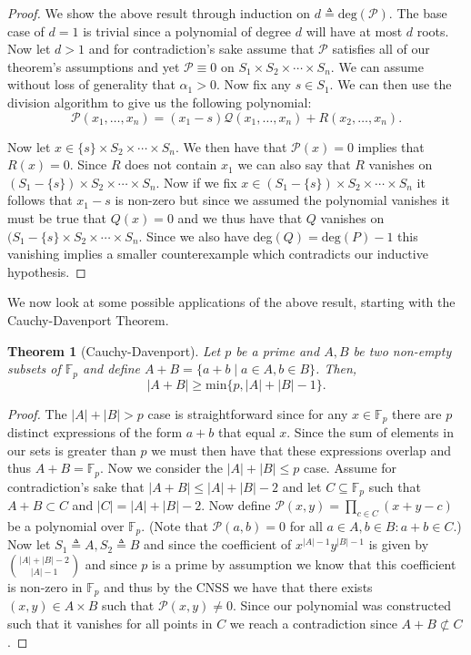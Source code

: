 \documentclass[11pt]{article}
\newtheorem{theorem}{Theorem}
\theoremstyle{definition}
\numberwithin{equation}{subsection}
\begin{document}
\begin{proof}
We show the above result through induction on $d\triangleq \text{deg}(\mathcal{P})$. The base case of $d=1$ is trivial since a polynomial of degree $d$ will have at most $d$ roots. Now let $d>1$ and for contradiction's sake assume that $\mathcal{P}$ satisfies all of our theorem's assumptions and yet $\mathcal{P}\equiv 0$ on $S_1\times S_2\times\cdots\times S_n$. We can assume without loss of generality that $\alpha_1>0$. Now fix any $s\in S_1$. We can then use the division algorithm to give us the following polynomial: $$\mathcal{P}(x_1,\ldots,x_n)=(x_1-s)\mathcal{Q}(x_1,\ldots,x_n)+R(x_2,\ldots,x_n).$$ 

Now let $x\in \{s\}\times S_2\times\cdots\times S_n$. We then have that $\mathcal{P}(x)=0$ implies that $R(x)=0$. Since $R$ does not contain $x_1$ we can also say that $R$ vanishes on $(S_1-\{s\})\times S_2\times\cdots\times S_n$. Now if we fix $x\in (S_1-\{s\})\times S_2\times\cdots\times S_n$ it follows that $x_1-s$ is non-zero but since we assumed the polynomial vanishes it must be true that $Q(x)=0$ and we thus have that $Q$ vanishes on $(S_1-\{s\}\times S_2\times\cdots\times S_n$. Since we also have deg$(Q)=\text{deg}(P)-1$ this vanishing implies a smaller counterexample which contradicts our inductive hypothesis.
\end{proof}

We now look at some possible applications of the above result, starting with the Cauchy-Davenport Theorem.

\begin{theorem}[Cauchy-Davenport]
Let $p$ be a prime and $A,B$ be two non-empty subsets of $\mathbb{F}_p$ and define $A+B=\{a+b\mid a\in A, b\in B\}$. Then, $$|A+B|\geq \text{min}\{p, |A|+|B|-1\}.$$
\end{theorem}

\begin{proof}
The $|A|+|B|>p$ case is straightforward since for any $x\in \mathbb{F}_p$ there are $p$ distinct expressions of the form $a+b$ that equal $x$. Since the sum of elements in our sets is greater than $p$ we must then have that these expressions overlap and thus $A+B=\mathbb{F}_p$. Now we consider the $|A|+|B|\leq p$ case. Assume for contradiction's sake that $|A+B|\leq |A|+|B|-2$ and let $C\subseteq \mathbb{F}_p$ such that $A+B\subset C$ and $|C|=|A|+|B|-2$. Now define $\mathcal{P}(x,y)=\prod_{c\in C}(x+y-c)$ be a polynomial over $\mathbb{F}_p$. (Note that $\mathcal{P}(a,b)=0$ for all $a\in A, b\in B\colon a+b\in C$.) Now let $S_1\triangleq A, S_2\triangleq B$ and since the coefficient of $x^{|A|-1}y^{|B|-1}$ is given by ${|A|+|B|-2\choose |A|-1}$ and since $p$ is a prime by assumption we know that this coefficient is non-zero in $\mathbb{F}_p$ and thus by the CNSS we have that there exists $(x,y)\in A\times B$ such that $\mathcal{P}(x,y)\neq 0$. Since our polynomial was constructed such that it vanishes for all points in $C$ we reach a contradiction since $A+B\not\subset C$.
\end{proof}
\end{document}
